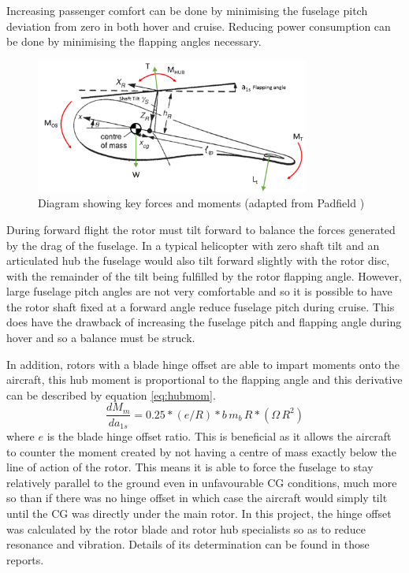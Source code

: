 \documentclass[11pt,a4paper]{article}
\begin{document}
Increasing passenger comfort can be done by minimising the fuselage pitch deviation from zero in both hover and cruise. Reducing power consumption can be done by minimising the flapping angles necessary.
\begin{figure}[H]
    \centering
    \includegraphics[width=0.8\textwidth]{FBD.PNG}
    \caption{Diagram showing key forces and moments (adapted from Padfield \cite{padfield})}
    \label{fig:fbd}
\end{figure}{}
During forward flight the rotor must tilt forward to balance the forces generated by the drag of the fuselage.
In a typical helicopter with zero shaft tilt and an articulated hub the fuselage would also tilt forward slightly with the rotor disc, with the remainder of the tilt being fulfilled by the rotor flapping angle. 
However, large fuselage pitch angles are not very comfortable and so it is possible to have the rotor shaft fixed at a forward angle reduce fuselage pitch during cruise. This does have the drawback of increasing the fuselage pitch and flapping angle during hover and so a balance must be struck.

In addition, rotors with a blade hinge offset are able to impart moments onto the aircraft, this hub moment is proportional to the flapping angle and this derivative can be described by equation \ref{eq:hubmom}.
\begin{equation}
    \frac{dM_m}{da_{1s}}=0.25*(e/R)*b\,m_b\,R*(\Omega\,R^2) \label{eq:hubmom}
\end{equation}{}
where $e$ is the blade hinge offset ratio.
This is beneficial as it allows the aircraft to counter the moment created by not having a centre of mass exactly below the line of action of the rotor. This means it is able to force the fuselage to stay relatively parallel to the ground even in unfavourable CG conditions, much more so than if there was no hinge offset in which case the aircraft would simply tilt until the CG was directly under the main rotor. In this project, the hinge offset was calculated by the rotor blade and rotor hub specialists so as to reduce resonance and vibration. Details of its determination can be found in those reports.
\end{document}
